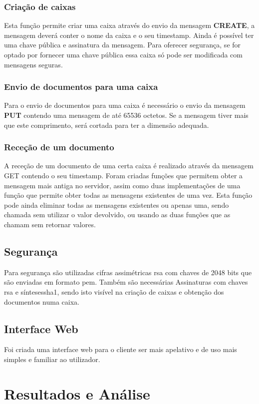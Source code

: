 \documentclass{report}
\begin{document}
\subsection{Criação de caixas}
Esta função permite criar uma caixa através do envio da mensagem \textbf{CREATE}, a mensagem deverá conter o nome da caixa e o seu timestamp. Ainda é possível ter uma chave pública e assinatura da mensagem. Para oferecer segurança, se for optado por fornecer uma chave pública essa caixa só pode ser modificada com mensagens seguras.


\subsection{Envio de documentos para uma caixa}
Para o envio de documentos para uma caixa é necessário o envio da mensagem \textbf{PUT} contendo uma mensagem de até 65536 octetos. Se a mensagem tiver mais que este comprimento, será cortada para ter a dimensão adequada.


\subsection{Receção de um documento}
A receção de um documento de uma certa caixa é realizado através da mensagem GET contendo o seu timestamp. Foram criadas funções que permitem obter a mensagem mais antiga no servidor, assim como duas implementações de uma função que permite obter todas as mensagens existentes de uma vez. Esta função pode ainda eliminar todas as mensagens existentes ou apenas uma, sendo chamada sem utilizar o valor devolvido, ou usando as duas funções que as chamam sem retornar valores.


\section{Segurança}
Para segurança são utilizadas cifras assimétricas \ac{rsa} com chaves de 2048 bits que são enviadas em formato \ac{pem}. Também são necessárias Assinaturas com chaves \ac{rsa} e sínteses{sha1}, sendo isto visível na criação de caixas e obtenção dos documentos numa caixa.

\section{Interface Web}
Foi criada uma interface web para o cliente ser mais apelativo e de uso mais simples e familiar ao utilizador.

\chapter{Resultados e Análise}
\label{chap.res}
\end{document}

